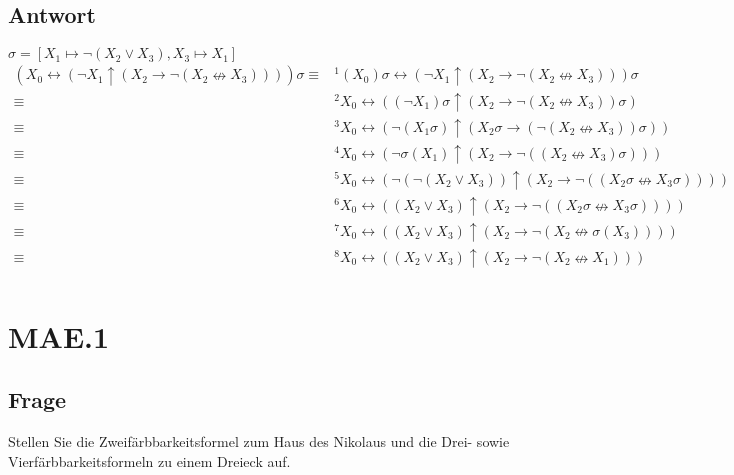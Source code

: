 \documentclass[12pt, a4paper]{article}
\begin{document}
\subsection*{Antwort}
$\sigma = [X_{1} \longmapsto \neg (X_{2} \vee X_{3}), X_{3} \longmapsto X_{1}]$
\begin{equation}
\begin{split}
(X_{0} \leftrightarrow (\neg X_{1} \uparrow (X_{2} \rightarrow \neg (X_{2} \nleftrightarrow X_{3}))))\sigma 
\equiv&^1 (X_{0})\sigma \leftrightarrow (\neg X_{1} \uparrow (X_{2} \rightarrow \neg (X_{2} \nleftrightarrow X_{3})))\sigma\\ 
\equiv&^2 X_{0} \leftrightarrow ((\neg X_{1})\sigma \uparrow (X_{2} \rightarrow \neg (X_{2} \nleftrightarrow X_{3}))\sigma)\\
\equiv&^3 X_{0} \leftrightarrow (\neg(X_{1}\sigma) \uparrow (X_{2}\sigma \rightarrow (\neg (X_{2} \nleftrightarrow X_{3}))\sigma))\\
\equiv&^4 X_{0} \leftrightarrow (\neg \sigma(X_{1}) \uparrow (X_{2} \rightarrow \neg ((X_{2} \nleftrightarrow X_{3})\sigma)))\\
\equiv&^5 X_{0} \leftrightarrow (\neg (\neg (X_{2} \vee X_{3})) \uparrow (X_{2} \rightarrow \neg ((X_{2}\sigma \nleftrightarrow X_{3}\sigma))))\\
\equiv&^6 X_{0} \leftrightarrow ((X_{2} \vee X_{3}) \uparrow (X_{2} \rightarrow \neg ((X_{2}\sigma \nleftrightarrow X_{3}\sigma))))\\
\equiv&^7 X_{0} \leftrightarrow ((X_{2} \vee X_{3}) \uparrow (X_{2} \rightarrow \neg (X_{2} \nleftrightarrow \sigma(X_{3}))))\\
\equiv&^8 X_{0} \leftrightarrow ((X_{2} \vee X_{3}) \uparrow (X_{2} \rightarrow \neg (X_{2} \nleftrightarrow X_1)))\\
\end{split}
\end{equation}

\section*{MAE.1}
\subsection*{Frage}
Stellen Sie die Zweifärbbarkeitsformel zum Haus des Nikolaus und die Drei- sowie Vierfärbbarkeitsformeln zu einem Dreieck auf.
\end{document}
